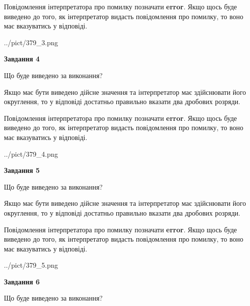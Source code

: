 \documentclass[12pt, ukrainian]{article}
\begin{document}
{\begin {Large}
Повідомлення інтерпретатора про помилку позначати \textbf{error}.
Якщо щось буде виведено до того, як інтерпретатор видасть повідомлення про помилку, 
то воно має вказуватись у відповіді. \par

\begin{center}
	{../pict/379_3.png}
\end{center}
\newpage

{\begin {center}\textbf{Завдання 4}\end {center}}\par
Що буде виведено за виконання? \par

Якщо має бути виведено дійсне значення та інтерпретатор має здійснювати його округлення, 
то у відповіді достатньо правильно вказати два дробових розряди.

Повідомлення інтерпретатора про помилку позначати \textbf{error}.
Якщо щось буде виведено до того, як інтерпретатор видасть повідомлення про помилку, 
то воно має вказуватись у відповіді. \par

\begin{center}
	{../pict/379_4.png}
\end{center}
\newpage

{\begin {center}\textbf{Завдання 5}\end {center}}\par
Що буде виведено за виконання? \par

Якщо має бути виведено дійсне значення та інтерпретатор має здійснювати його округлення, 
то у відповіді достатньо правильно вказати два дробових розряди.

Повідомлення інтерпретатора про помилку позначати \textbf{error}.
Якщо щось буде виведено до того, як інтерпретатор видасть повідомлення про помилку, 
то воно має вказуватись у відповіді. \par

\begin{center}
	{../pict/379_5.png}
\end{center}
\newpage

{\begin {center}\textbf{Завдання 6}\end {center}}\par
Що буде виведено за виконання? \par


\end{Large}}
\end{document}
